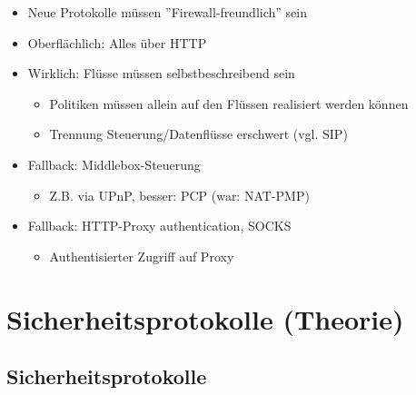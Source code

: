 \documentclass[openany]{book}
\begin{document}
\begin{itemize}
    \item Neue Protokolle müssen ''Firewall-freundlich'' sein
    \item Oberflächlich: Alles über HTTP
    \item Wirklich: Flüsse müssen selbstbeschreibend sein
    \begin{itemize}
        \item Politiken müssen allein auf den Flüssen realisiert werden können
        \item Trennung Steuerung/Datenflüsse erschwert (vgl. SIP)
    \end{itemize}
    \item Fallback: Middlebox-Steuerung
    \begin{itemize}
        \item Z.B. via UPnP, besser: PCP (war: NAT-PMP)
    \end{itemize}
    \item Fallback: HTTP-Proxy authentication, SOCKS
    \begin{itemize}
        \item Authentisierter Zugriff auf Proxy
    \end{itemize}
\end{itemize}

\chapter{Sicherheitsprotokolle (Theorie)}

\section{Sicherheitsprotokolle}
\end{document}
